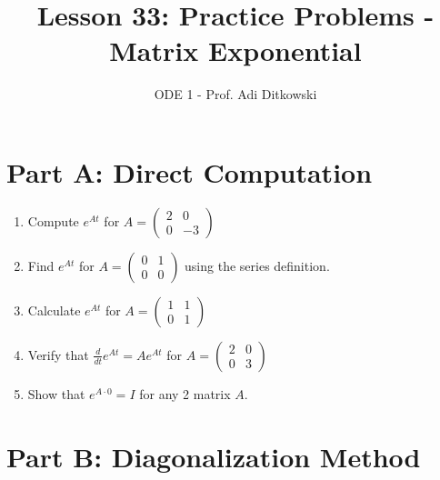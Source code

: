 \documentclass[12pt]{article}
\title{Lesson 33: Practice Problems - Matrix Exponential}
\author{ODE 1 - Prof. Adi Ditkowski}
\date{}
\begin{document}
\maketitle

\section*{Part A: Direct Computation}

\begin{enumerate}
\item Compute $e^{At}$ for $A = \begin{pmatrix} 2 & 0 \\ 0 & -3 \end{pmatrix}$

\item Find $e^{At}$ for $A = \begin{pmatrix} 0 & 1 \\ 0 & 0 \end{pmatrix}$ using the series definition.

\item Calculate $e^{At}$ for $A = \begin{pmatrix} 1 & 1 \\ 0 & 1 \end{pmatrix}$

\item Verify that $\frac{d}{dt}e^{At} = Ae^{At}$ for $A = \begin{pmatrix} 2 & 0 \\ 0 & 3 \end{pmatrix}$

\item Show that $e^{A \cdot 0} = I$ for any 2 matrix $A$.
\end{enumerate}

\section*{Part B: Diagonalization Method}
\end{document}
